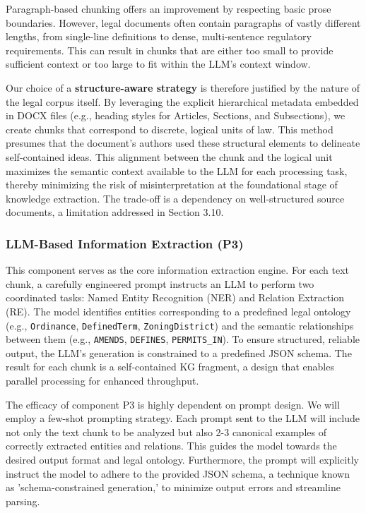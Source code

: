 Paragraph-based chunking offers an improvement by respecting basic prose boundaries. However, legal documents often contain paragraphs of vastly different lengths, from single-line definitions to dense, multi-sentence regulatory requirements. This can result in chunks that are either too small to provide sufficient context or too large to fit within the LLM's context window.

Our choice of a \textbf{structure-aware strategy} is therefore justified by the nature of the legal corpus itself. By leveraging the explicit hierarchical metadata embedded in DOCX files (e.g., heading styles for Articles, Sections, and Subsections), we create chunks that correspond to discrete, logical units of law. This method presumes that the document's authors used these structural elements to delineate self-contained ideas. This alignment between the chunk and the logical unit maximizes the semantic context available to the LLM for each processing task, thereby minimizing the risk of misinterpretation at the foundational stage of knowledge extraction. The trade-off is a dependency on well-structured source documents, a limitation addressed in Section 3.10.

\subsubsection{LLM-Based Information Extraction (P3)}
This component serves as the core information extraction engine. For each text chunk, a carefully engineered prompt instructs an LLM to perform two coordinated tasks: Named Entity Recognition (NER) and Relation Extraction (RE). The model identifies entities corresponding to a predefined legal ontology (e.g., \texttt{Ordinance}, \texttt{DefinedTerm}, \texttt{ZoningDistrict}) and the semantic relationships between them (e.g., \texttt{AMENDS}, \texttt{DEFINES}, \texttt{PERMITS\_IN}). To ensure structured, reliable output, the LLM’s generation is constrained to a predefined JSON schema. The result for each chunk is a self-contained KG fragment, a design that enables parallel processing for enhanced throughput.

The efficacy of component P3 is highly dependent on prompt design. We will employ a few-shot prompting strategy. Each prompt sent to the LLM will include not only the text chunk to be analyzed but also 2-3 canonical examples of correctly extracted entities and relations. This guides the model towards the desired output format and legal ontology. Furthermore, the prompt will explicitly instruct the model to adhere to the provided JSON schema, a technique known as 'schema-constrained generation,' to minimize output errors and streamline parsing.

